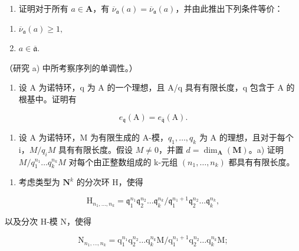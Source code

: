 \begin{enumerate}
\def\labelenumi{\alph{enumi})}
\setcounter{enumi}{1}
\tightlist
\item
  证明对于所有 \(a \in \mathbf{A}\)，有 \(\overline{\nu}_{\mathfrak{a}}(a) = \overline{\nu}_{\mathfrak{a}}(a)\)，并由此推出下列条件等价：
\end{enumerate}

\begin{enumerate}
\def\labelenumi{(\roman{enumi})}
\item
  \(\overline{\nu}_{\mathfrak{a}}(a)\geqslant 1,\)
\item
  \(a \in \overline{\mathfrak{a}}\).
\end{enumerate}

（研究 a) 中所考察序列的单调性。）

\begin{enumerate}
\def\labelenumi{\arabic{enumi})}
\setcounter{enumi}{18}
\tightlist
\item
  设 A 为诺特环，q 为 A 的一个理想，且 A/q 具有有限长度，q 包含于 A 的根基中。证明有
\end{enumerate}

\[
e _ {\mathfrak {q}} (\mathrm{A}) = e _ {\overline {{\mathfrak {q}}}} (\mathrm{A}).
\]

\begin{enumerate}
\def\labelenumi{\arabic{enumi})}
\setcounter{enumi}{19}
\tightlist
\item
  设 A 为诺特环，M 为有限生成的 A-模，\(q_{1}, \ldots, q_{k}\) 为 A 的理想，且对于每个 i，\(M/q_{i}M\) 具有有限长度。假设 \(M \neq 0\)，并置 \(d = \dim_{\mathbf{A}}(\mathbf{M})\)。a) 证明 \(M/q_{1}^{n_{1}} \ldots q_{k}^{n_{k}}M\) 对每个由正整数组成的 k-元组 \((n_{1}, \ldots, n_{k})\) 都具有有限长度。
\end{enumerate}

\begin{enumerate}
\def\labelenumi{\alph{enumi})}
\setcounter{enumi}{1}
\tightlist
\item
  考虑类型为 \(\mathbf{N}^k\) 的分次环 H，使得
\end{enumerate}

\[
\mathrm{H} _ {n _ {1}, \dots , n _ {k}} = \mathfrak {q} _ {1} ^ {n _ {1}} \mathfrak {q} _ {2} ^ {n _ {2}} \dots \mathfrak {q} _ {k} ^ {n _ {k}} / \mathfrak {q} _ {1} ^ {n _ {1} + 1} \mathfrak {q} _ {2} ^ {n _ {2}} \dots \mathfrak {q} _ {k} ^ {n _ {k}},
\]

以及分次 H-模 N，使得

\[
 \mathrm{N} _ {n _ {1}, \dots , n _ {k}} = \mathrm{q} _ {1} ^ {n _ {1}} \mathrm{q} _ {2} ^ {n _ {2}} \dots \mathrm{q} _ {k} ^ {n _ {k}} \mathrm{M} / \mathrm{q} _ {1} ^ {n _ {1} + 1} \mathrm{q} _ {2} ^ {n _ {2}} \dots \mathrm{q} _ {k} ^ {n _ {k}} \mathrm{M};
\]

